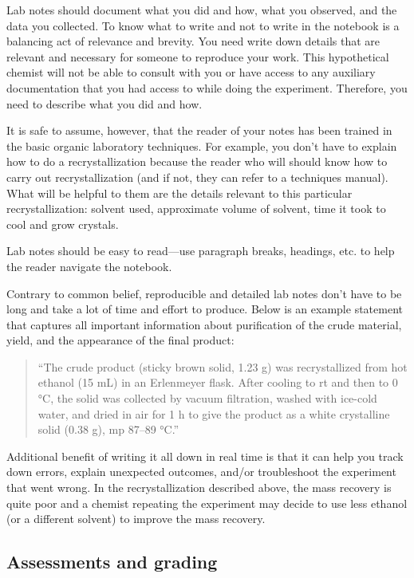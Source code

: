 Lab notes should document what you did and how, what you observed, and
the data you collected. To know what to write and not to write in the
notebook is a balancing act of relevance and brevity. You need write
down details that are relevant and necessary for someone to reproduce
your work. This hypothetical chemist will not be able to consult with
you or have access to any auxiliary documentation that you had access to
while doing the experiment. Therefore, you need to describe what you did
and how.

It is safe to assume, however, that the reader of your notes has been
trained in the basic organic laboratory techniques. For example, you
don't have to explain how to do a recrystallization because the reader
who will should know how to carry out recrystallization (and if not,
they can refer to a techniques manual). What will be helpful to them are
the details relevant to this particular recrystallization: solvent used,
approximate volume of solvent, time it took to cool and grow crystals.

Lab notes should be easy to read---use paragraph breaks, headings, etc.
to help the reader navigate the notebook.

Contrary to common belief, reproducible and detailed lab notes don't
have to be long and take a lot of time and effort to produce. Below is
an example statement that captures all important information about
purification of the crude material, yield, and the appearance of the
final product:

\begin{quote}
``The crude product (sticky brown solid, 1.23 g) was recrystallized from
hot ethanol (15 mL) in an Erlenmeyer flask. After cooling to rt and then
to 0 °C, the solid was collected by vacuum filtration, washed with
ice-cold water, and dried in air for 1 h to give the product as a white
crystalline solid (0.38 g), mp 87--89 °C.''
\end{quote}

Additional benefit of writing it all down in real time is that it can
help you track down errors, explain unexpected outcomes, and/or
troubleshoot the experiment that went wrong. In the recrystallization
described above, the mass recovery is quite poor and a chemist repeating
the experiment may decide to use less ethanol (or a different solvent)
to improve the mass recovery.

\subsection{Assessments and grading}\label{assessments-and-grading}

